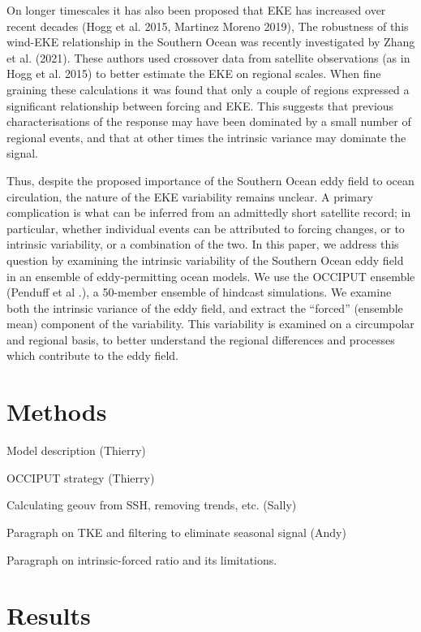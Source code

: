 \documentclass{agujournal2019-navid}
\begin{document}
On longer timescales it has also been proposed that EKE has increased over recent decades (Hogg et al. 2015, Martinez Moreno 2019),
The robustness of this wind-EKE relationship in the Southern Ocean was recently investigated by Zhang et al. (2021).
These authors used crossover data from satellite observations (as in Hogg et al. 2015) to better estimate the EKE on regional scales. 
When fine graining these calculations it was found that only a couple of regions expressed a significant relationship between forcing and EKE.
This suggests that previous characterisations of the response may have been dominated by a small number of regional events, and that at other times the intrinsic variance may dominate the signal.

Thus, despite the proposed importance of the Southern Ocean eddy field to ocean circulation, the nature of the EKE variability remains unclear.
A primary complication is what can be inferred from an admittedly short satellite record; in particular, whether individual events can be attributed to forcing changes, or to intrinsic variability, or a combination of the two.
In this paper, we address this question by examining the intrinsic variability of the Southern Ocean eddy field in an ensemble of eddy-permitting  ocean models.
We use the OCCIPUT ensemble (Penduff et al .), a 50-member ensemble of hindcast simulations.
We examine both the intrinsic variance of the eddy field, and extract the ``forced'' (ensemble mean) component of the variability.
This variability is examined on a circumpolar and regional basis, to better understand the regional differences and processes which contribute to the eddy field.



\section{Methods}

Model description (Thierry)

OCCIPUT strategy (Thierry)

Calculating geouv from SSH, removing trends, etc. (Sally)

Paragraph on TKE and filtering  to eliminate seasonal signal (Andy)

Paragraph on intrinsic-forced ratio and its limitations.


\section{Results}
\end{document}
